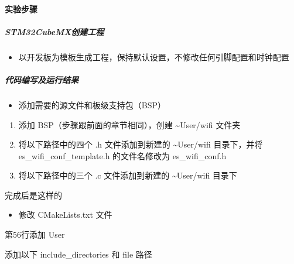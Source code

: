 \documentclass[a4paper,12pt,english]{sphinxmanual}
\begin{document}
\paragraph{实验步骤}
\label{\detokenize{exp-stm32/wifi/tcp-over-wifi:id6}}

\subparagraph{STM32CubeMX创建工程}
\label{\detokenize{exp-stm32/wifi/tcp-over-wifi:stm32cubemx}}\begin{itemize}
\item {} 
\sphinxAtStartPar
以开发板为模板生成工程，保持默认设置，不修改任何引脚配置和时钟配置

\end{itemize}


\subparagraph{代码编写及运行结果}
\label{\detokenize{exp-stm32/wifi/tcp-over-wifi:id7}}\begin{itemize}
\item {} 
\sphinxAtStartPar
添加需要的源文件和板级支持包（BSP）

\end{itemize}
\begin{enumerate}
%
\item {} 
\sphinxAtStartPar
添加 BSP（步骤跟前面的章节相同），创建 \textasciitilde{}User/wifi 文件夹

\item {} 
\sphinxAtStartPar
将以下路径中的四个 .h 文件添加到新建的 \textasciitilde{}User/wifi 目录下，并将 es\_wifi\_conf\_template.h 的文件名修改为 es\_wifi\_conf.h 

\item {} 
\sphinxAtStartPar
将以下路径中的三个 .c 文件添加到新建的 \textasciitilde{}User/wifi 目录下

\end{enumerate}

\sphinxAtStartPar
完成后是这样的

\sphinxAtStartPar
{}
\begin{itemize}
\item {} 
\sphinxAtStartPar
修改 CMakeLists.txt 文件

\end{itemize}

\sphinxAtStartPar
第56行添加 User

\sphinxAtStartPar
{}

\sphinxAtStartPar
添加以下 include\_directories 和 file 路径
\end{document}
